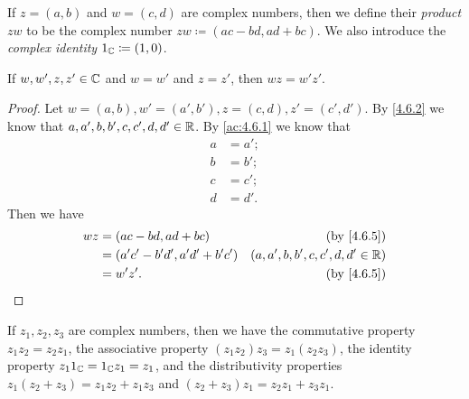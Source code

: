 \begin{defn}\label{4.6.5}
  If \(z = (a, b)\) and \(w = (c, d)\) are complex numbers, then we define their \emph{product} \(zw\) to be the complex number \(zw \coloneqq (ac - bd, ad + bc)\).
  We also introduce the \emph{complex identity} \(1_{\mathbb{C}} \coloneqq (1, 0)\).
\end{defn}

\begin{ac}\label{ac:4.6.3}
  If \(w, w', z, z' \in \mathbb{C}\) and \(w = w'\) and \(z = z'\), then \(wz = w'z'\).
\end{ac}

\begin{proof}
  Let \(w = (a, b), w' = (a', b'), z = (c, d), z' = (c', d')\).
  By \cref{4.6.2} we know that \(a, a', b, b', c, c', d, d' \in \mathbb{R}\).
  By \cref{ac:4.6.1} we know that
  \begin{align*}
    a & = a'; \\
    b & = b'; \\
    c & = c'; \\
    d & = d'.
  \end{align*}
  Then we have
  \begin{align*}
    wz & = (ac - bd, ad + bc)             & \text{(by \cref{4.6.5})}            \\
       & = (a' c' - b' d', a' d' + b' c') & (a, a', b, b', c, c', d, d' \in \R) \\
       & = w' z'.                         & \text{(by \cref{4.6.5})}
  \end{align*}
\end{proof}

\begin{lem}\label{4.6.6}
  If \(z_1, z_2, z_3\) are complex numbers, then we have the commutative property \(z_1 z_2 = z_2 z_1\), the associative property \((z_1 z_2) z_3 = z_1 (z_2 z_3)\), the identity property \(z_1 1_{\mathbb{C}} = 1_{\mathbb{C}} z_1 = z_1\), and the distributivity properties \(z_1 (z_2 + z_3) = z_1 z_2 + z_1 z_3\) and \((z_2 + z_3) z_1 = z_2 z_1 + z_3 z_1\).
\end{lem}


